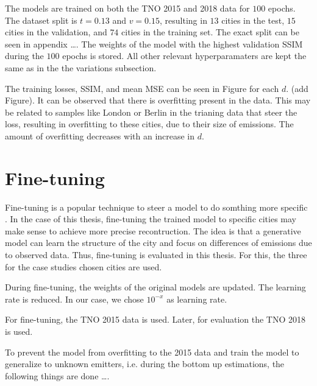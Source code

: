 The models are trained on both the TNO 2015 and 2018 data for $100$ epochs.
The dataset split is $t = 0.13$ and $v = 0.15$, resulting in $13$ cities in the test, $15$ cities in the validation, and $74$ cities in the training set.
The exact split can be seen in appendix \dots.
The weights of the model with the highest validation SSIM during the $100$ epochs is stored.
All other relevant hyperparamaters are kept the same as in the the variations subsection.

The training losses, SSIM, and mean MSE can be seen in Figure for each $d$.
(add Figure).
It can be observed that there is overfitting present in the data.
This may be related to samples like London or Berlin in the trianing data that steer the loss, resulting in overfitting to these cities, due to their size of emissions.
The amount of overfitting decreases with an increase in $d$.


\section{Fine-tuning}
Fine-tuning is a popular technique to steer a model to do somthing more specific \cite{FineTuning}.
In the case of this thesis, fine-tuning the trained model to specific cities may make sense to achieve more precise recontruction.
The idea is that a generative model can learn the structure of the city and focus on differences of emissions due to observed data.
Thus, fine-tuning is evaluated in this thesis.
For this, the three for the case studies chosen cities are used.

During fine-tuning, the weights of the original models are updated.
The learning rate is reduced.
In our case, we chose $10^{-x}$ as learning rate.

For fine-tuning, the TNO 2015 data is used.
Later, for evaluation the TNO 2018 is used.

To prevent the model from overfitting to the 2015 data and train the model to generalize to unknown emitters, i.e. during the bottom up estimations, the following things are done \dots.


